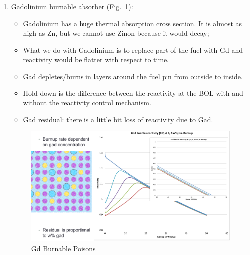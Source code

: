 \documentclass{school-22.211-notes}
\begin{document}
\begin{enumerate}
\item Gadolinium burnable absorber (Fig.~\ref{Gd-BP}): 
  \begin{itemize}
  \item Gadolinium has a huge thermal absorption cross section. It is
    almost as high as Zn, but we cannot use Zinon because it would
    decay;
  \item What we do with Gadolinium is to replace part of the fuel with
    Gd and reactivity would be flatter with respect to time.
  \item Gad depletes/burns in layers around the fuel pin from outside
    to inside. ]
  \item Hold-down is the difference between the reactivity at the BOL
    with and without the reactivity control mechanism.
  \item Gad residual: there is a little bit loss of reactivity due to Gad. 
  \end{itemize}
  \begin{figure}
    \centering
    \includegraphics[width=5in]{images/dfs/Gd-BP.png}
    \caption{Gd Burnable Poisons}  \label{Gd-BP}
  \end{figure}
\end{enumerate}
\end{document}
